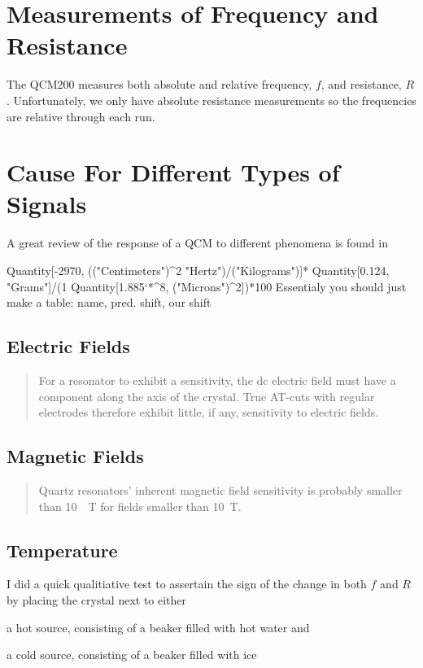 \documentclass[a4paper]{article}
\begin{document}
\section{Measurements of Frequency and Resistance}
The QCM200 measures both absolute and relative frequency, $f$, and
resistance, $R$.  Unfortunately, we only have absolute resistance
measurements so the frequencies are relative through each run.

\section{Cause For Different Types of Signals}
A great review of the response of a QCM to different phenomena is found in \cite{walls1995fundamental}

Quantity[-2970, (("Centimeters")^2 "Hertz")/("Kilograms")]*
 Quantity[0.124, "Grams"]/(1 Quantity[1.885`*^8, ("Microns")^2])*100
Essentialy you should just make a table: name, pred. shift, our shift
\subsection{Electric Fields}
\begin{quote}
For a resonator to exhibit a sensitivity, the dc electric field must have a
component along the axis of the crystal. True AT-cuts with regular electrodes
therefore exhibit little, if any, sensitivity to electric fields. \cite{walls1995fundamental}
\end{quote}
\subsection{Magnetic Fields}
\begin{quote}
Quartz resonators’ inherent magnetic field sensitivity is
probably smaller than \SI{10}{\per\tesla} for fields smaller than \SI{10}{\tesla}. \cite{walls1995fundamental}
\end{quote}


\subsection{Temperature}
I did a quick qualitiative test to assertain the sign of the change in both
$f$ and $R$ by placing the crystal next to either
\begin{inparaenum}
 \item a hot source, consisting of a beaker filled with hot water and
 \item a cold source, consisting of a beaker filled with ice
\end{inparaenum}
\end{document}
